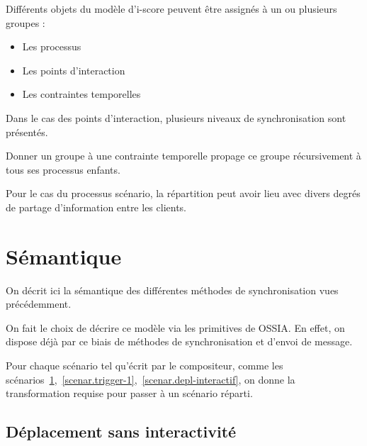 \documentclass[10pt]{article}
\newcommand\ossia{OSSIA\xspace}
\begin{document}
Différents objets du modèle d'i-score peuvent être assignés à un ou plusieurs groupes : 

\begin{itemize}
	\item Les processus
	\item Les points d'interaction
	\item Les contraintes temporelles
\end{itemize}

Dans le cas des points d'interaction, plusieurs niveaux de synchronisation sont présentés.

Donner un groupe à une contrainte temporelle propage ce groupe récursivement à tous ses processus enfants.

Pour le cas du processus scénario, la répartition peut avoir lieu avec divers degrés de partage d'information entre les clients.


\section{Sémantique}\label{sec.semantique}
On décrit ici la sémantique des différentes méthodes de synchronisation vues précédemment.

On fait le choix de décrire ce modèle via les primitives de \ossia{}. 
En effet, on dispose déjà par ce biais de méthodes de synchronisation et d'envoi de message.

Pour chaque scénario tel qu'écrit par le compositeur, comme les scénarios~\ref{scenar.simple},~\ref{scenar.trigger-1},~\ref{scenar.depl-interactif}, on donne la transformation requise pour passer à un scénario réparti.


\subsection{Déplacement sans interactivité}
\begin{figure}[h]
    \centering
    \begin{tikzpicture}
    
    \end{tikzpicture}
    \label{scenar.simple}
\end{figure} 
\end{document}
